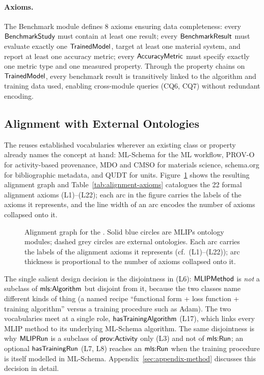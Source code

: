 \paragraph{Axioms.}
The Benchmark module defines 8 axioms ensuring data completeness: every
$\mathsf{BenchmarkStudy}$ must contain at least one result; every
$\mathsf{BenchmarkResult}$ must evaluate exactly one $\mathsf{TrainedModel}$, target at
least one material system, and report at least one accuracy metric; every
$\mathsf{AccuracyMetric}$ must specify exactly one metric type and one measured
property. Through the property chains on $\mathsf{TrainedModel}$, every benchmark
result is transitively linked to the algorithm and training data used,
enabling cross-module queries (CQ6, CQ7) without redundant encoding.



\subsection{Alignment with External Ontologies}
\label{sec:alignment}

The \MLIPsOntology{} reuses established vocabularies wherever an
existing class or property already names the concept at hand:
ML-Schema for the ML workflow, PROV-O for activity-based
provenance, MDO and CMSO for materials science, schema.org for
bibliographic metadata, and QUDT for units. Figure~\ref{fig:alignments}
shows the resulting alignment graph and
Table~\ref{tab:alignment-axioms} catalogues the 22 formal
alignment axioms (L1)--(L22); each arc in the figure carries the
labels of the axioms it represents, and the line width of an arc
encodes the number of axioms collapsed onto it.

\begin{figure}[t]
\centering
\resizebox{\textwidth}{!}{}
\caption{Alignment graph for the \MLIPsOntology{}. Solid blue
  circles are MLIPs ontology modules; dashed grey circles are
  external ontologies. Each arc carries the labels of the
  alignment axioms it represents (cf.\ (L1)--(L22)); arc
  thickness is proportional to the number of axioms collapsed
  onto it.}
\label{fig:alignments}
\end{figure}



The single salient design decision is the disjointness in (L6):
$\mathsf{MLIPMethod}$ is \emph{not} a subclass of $\mathsf{mls{:}Algorithm}$ but
disjoint from it, because the two classes name different kinds of
thing (a named recipe ``functional form + loss function + training
algorithm'' versus a training procedure such as Adam). The two
vocabularies meet at a single role, $\mathsf{hasTrainingAlgorithm}$
(L17), which links every MLIP method to its underlying ML-Schema
algorithm. The same disjointness is why $\mathsf{MLIPRun}$ is a subclass
of $\mathsf{prov{:}Activity}$ only (L3) and not of $\mathsf{mls{:}Run}$; an optional
$\mathsf{hasTrainingRun}$ (L7, L8) reaches an $\mathsf{mls{:}Run}$ when the
training procedure is itself modelled in ML-Schema.
Appendix~\ref{sec:appendix-method} discusses this decision in
detail.




